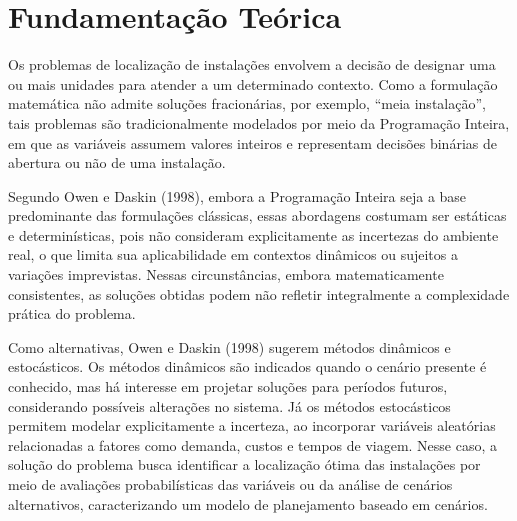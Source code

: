 \documentclass[12pt]{article}
\begin{document}
\section{Fundamentação Teórica}

Os problemas de localização de instalações envolvem a decisão de designar uma ou mais unidades para atender a um determinado contexto. Como a formulação matemática não admite soluções fracionárias, por exemplo, “meia instalação”, tais problemas são tradicionalmente modelados por meio da Programação Inteira, em que as variáveis assumem valores inteiros e representam decisões binárias de abertura ou não de uma instalação.

Segundo Owen e Daskin (1998), embora a Programação Inteira seja a base predominante das formulações clássicas, essas abordagens costumam ser estáticas e determinísticas, pois não consideram explicitamente as incertezas do ambiente real, o que limita sua aplicabilidade em contextos dinâmicos ou sujeitos a variações imprevistas. Nessas circunstâncias, embora matematicamente consistentes, as soluções obtidas podem não refletir integralmente a complexidade prática do problema.

Como alternativas, Owen e Daskin (1998) sugerem métodos dinâmicos e estocásticos. Os métodos dinâmicos são indicados quando o cenário presente é conhecido, mas há interesse em projetar soluções para períodos futuros, considerando possíveis alterações no sistema. Já os métodos estocásticos permitem modelar explicitamente a incerteza, ao incorporar variáveis aleatórias relacionadas a fatores como demanda, custos e tempos de viagem. Nesse caso, a solução do problema busca identificar a localização ótima das instalações por meio de avaliações probabilísticas das variáveis ou da análise de cenários alternativos, caracterizando um modelo de planejamento baseado em cenários.
\end{document}
